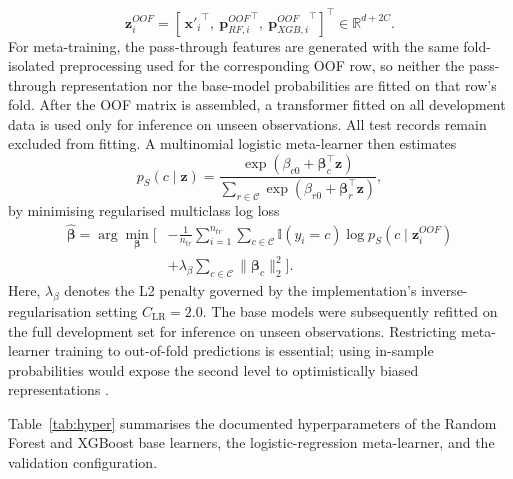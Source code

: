 \documentclass[a4paper,fleqn]{cas-dc}
\begin{document}
\begin{equation}
\mathbf{z}^{OOF}_i=\left[\,{\mathbf{x}'_i}^{\!\top},\
{\mathbf{p}_{RF,i}^{OOF}}^{\!\top},\
{\mathbf{p}_{XGB,i}^{OOF}}^{\!\top}\right]^{\!\top}
\in\mathbb{R}^{d+2C}.
\label{eq:oofvector}
\end{equation}
For meta-training, the pass-through features are generated with the same fold-isolated preprocessing used for the corresponding OOF row, so neither the pass-through representation nor the base-model probabilities are fitted on that row's fold. After the OOF matrix is assembled, a transformer fitted on all development data is used only for inference on unseen observations. All test records remain excluded from fitting. A multinomial logistic meta-learner then estimates
\\
\begin{equation}
p_{S}(c\mid\mathbf{z})=
\frac{\exp(\beta_{c0}+\boldsymbol{\beta}_c^{\top}\mathbf{z})}
{\sum_{r\in\mathcal{C}}\exp(\beta_{r0}+\boldsymbol{\beta}_r^{\top}\mathbf{z})},
\label{eq:meta}
\end{equation}
by minimising regularised multiclass log loss
\begin{equation}
\begin{aligned}
\widehat{\boldsymbol{\beta}}=\arg\min_{\boldsymbol{\beta}}\Biggl[&
-\frac{1}{n_{tr}}\sum_{i=1}^{n_{tr}}\sum_{c\in\mathcal{C}}
\mathbb{I}(y_i=c)\log p_S(c\mid\mathbf{z}^{OOF}_i)\\
&+\lambda_{\beta}\sum_{c\in\mathcal{C}}\lVert\boldsymbol{\beta}_c\rVert_2^2\Biggr].
\end{aligned}
\label{eq:metaloss}
\end{equation}
Here, $\lambda_{\beta}$ denotes the L2 penalty governed by the implementation's inverse-regularisation setting $C_{\mathrm{LR}}=2.0$. The base models were subsequently refitted on the full development set for inference on unseen observations. Restricting meta-learner training to out-of-fold predictions is essential; using in-sample probabilities would expose the second level to optimistically biased representations \cite{kapoor2023,alabi2023}.

Table~\ref{tab:hyper} summarises the documented hyperparameters of the Random Forest and XGBoost base learners, the logistic-regression meta-learner, and the validation configuration.
\end{document}
